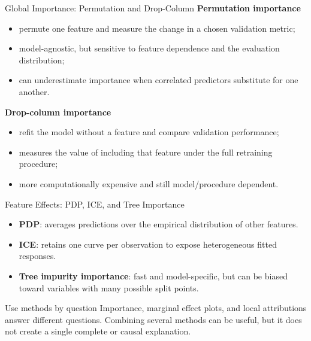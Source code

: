 \begin{frame}{Global Importance: Permutation and Drop-Column}
\textbf{Permutation importance}
\begin{itemize}
  \item permute one feature and measure the change in a chosen validation metric;
  \item model-agnostic, but sensitive to feature dependence and the evaluation distribution;
  \item can underestimate importance when correlated predictors substitute for one another.
\end{itemize}

\textbf{Drop-column importance}
\begin{itemize}
  \item refit the model without a feature and compare validation performance;
  \item measures the value of including that feature under the full retraining procedure;
  \item more computationally expensive and still model/procedure dependent.
\end{itemize}
\end{frame}

\begin{frame}{Feature Effects: PDP, ICE, and Tree Importance}
\begin{itemize}
  \item \textbf{PDP}: averages predictions over the empirical distribution of other features.
  \item \textbf{ICE}: retains one curve per observation to expose heterogeneous fitted responses.
  \item \textbf{Tree impurity importance}: fast and model-specific, but can be biased toward variables with many possible split points.
\end{itemize}

\begin{alertblock}{Use methods by question}
Importance, marginal effect plots, and local attributions answer different questions. Combining several methods can be useful, but it does not create a single complete or causal explanation.
\end{alertblock}
\end{frame}

